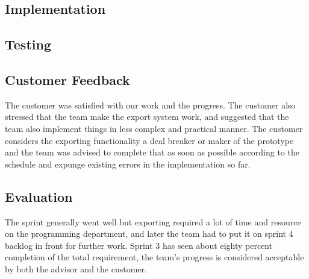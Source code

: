 	\subsection{Implementation}

	\subsection{Testing}

	\subsection{Customer Feedback}
The customer was satisfied with our work and the progress. The customer also stressed that the team make the export system work, and suggested that the team also implement things in less complex and practical manner. The customer considers the exporting functionality a deal breaker or maker of the prototype and the team was advised to complete that as soon as possible according to the schedule and expunge existing errors in the implementation so far.
	\subsection{Evaluation}
The sprint generally went well but exporting required a lot of time and resource on the programming department, and later the team had to put it on sprint 4 backlog in front for further work. Sprint 3 has seen about eighty percent completion of the total requirement, the team's progress is considered acceptable by both the advisor and the customer. 